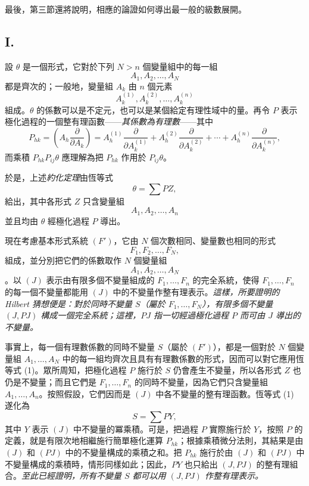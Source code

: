 \documentclass[11pt]{article}
\begin{document}
最後，第三節還將說明，相應的論證如何導出最一般的級數展開。

\subsection*{I.}
設 $\theta$ 是一個形式，它對於下列 $N>n$ 個變量組中的每一組
\[
  A_1,A_2,\ldots,A_N
\]
都是齊次的；一般地，變量組 $A_k$ 由 $n$ 個元素
\[
  A_k^{(1)},A_k^{(2)},\ldots,A_k^{(n)}
\]
組成。$\theta$ 的係數可以是不定元，也可以是某個給定有理性域中的量。再令 $P$ 表示極化過程的一個整有理函數——\emph{其係數為有理數}——其中
\[
  P_{hk}=\left(A_h\frac{\partial}{\partial A_k}\right)
  =A_h^{(1)}\frac{\partial}{\partial A_k^{(1)}}+
   A_h^{(2)}\frac{\partial}{\partial A_k^{(2)}}+
   \cdots+
   A_h^{(n)}\frac{\partial}{\partial A_k^{(n)}},
\]
而乘積 $P_{hk}P_{ij}\theta$ 應理解為把 $P_{hk}$ 作用於 $P_{ij}\theta$。

於是，上述\emph{約化定理}由恆等式
\begin{equation}
  \theta=\sum PZ,
\tag{1}
\end{equation}
給出，其中各形式 $Z$ 只含變量組
\[
  A_1,A_2,\ldots,A_n
\]
並且均由 $\theta$ 經極化過程 $P$ 導出。

現在考慮基本形式系統 $(F')$，它由 $N$ 個次數相同、變量數也相同的形式
\[
  F_1,F_2,\ldots,F_N,
\]
組成，並分別把它們的係數取作 $N$ 個變量組
\[
  A_1,A_2,\ldots,A_N
\]
。以 $(J)$ 表示由有限多個不變量組成的 $F_1,\ldots,F_n$ 的完全系統，使得 $F_1,\ldots,F_n$ 的每一個不變量都能用 $(J)$ 中的不變量作整有理表示。\emph{這樣，所要證明的 Hilbert 猜想便是：對於同時不變量 $S$（屬於 $F_1,\ldots,F_N$），有限多個不變量 $(J,PJ)$ 構成一個完全系統；這裡，$PJ$ 指一切經過極化過程 $P$ 而可由 $J$ 導出的不變量。}

事實上，每一個有理數係數的同時不變量 $S$（屬於 $(F')$），都是一個對於 $N$ 個變量組 $A_1,\ldots,A_N$ 中的每一組均齊次且具有有理數係數的形式，因而可以對它應用恆等式 (1)。眾所周知，把極化過程 $P$ 施行於 $S$ 仍會產生不變量，所以各形式 $Z$ 也仍是不變量；而且它們是 $F_1,
\ldots,F_n$ 的同時不變量，因為它們只含變量組 $A_1,
\ldots,A_n$。按照假設，它們因而是 $(J)$ 中各不變量的整有理函數。恆等式 (1) 遂化為
\[
  S=\sum PY,
\]
其中 $Y$ 表示 $(J)$ 中不變量的冪乘積。可是，把過程 $P$ 實際施行於 $Y$，按照 $P$ 的定義，就是有限次地相繼施行簡單極化運算 $P_{hk}$；根據乘積微分法則，其結果是由 $(J)$ 和 $(PJ)$ 中的不變量構成的乘積之和。把 $P_{hk}$ 施行於由 $(J)$ 和 $(PJ)$ 中不變量構成的乘積時，情形同樣如此；因此，$PY$ 也只給出 $(J,PJ)$ 的整有理組合。\emph{至此已經證明，所有不變量 $S$ 都可以用 $(J,PJ)$ 作整有理表示。}
\end{document}
